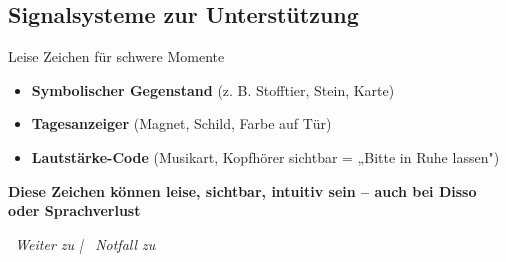 \subsection*{\textcolor{ctmmOrange}{Signalsysteme zur Unterstützung}}

\begin{ctmmOrangeBox}{Leise Zeichen für schwere Momente}
\begin{itemize}
  \item \textbf{Symbolischer Gegenstand} (z. B. Stofftier, Stein, Karte)
  \item \textbf{Tagesanzeiger} (Magnet, Schild, Farbe auf Tür)
  \item \textbf{Lautstärke-Code} (Musikart, Kopfhörer sichtbar = „Bitte in Ruhe lassen")
\end{itemize}

\textbf{Diese Zeichen können leise, sichtbar, intuitiv sein -- auch bei Disso oder Sprachverlust}
\end{ctmmOrangeBox}

\vspace{1cm}
\begin{center}
\textit{\textcolor{ctmmGreen}{\faChevronRight~Weiter zu}  | \textcolor{ctmmRed}{\faExclamationTriangle~Notfall zu} }
\end{center}
